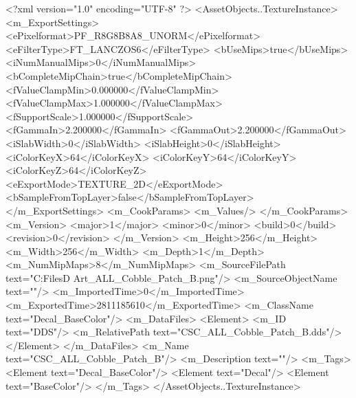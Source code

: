 <?xml version="1.0" encoding="UTF-8" ?>
<AssetObjects..TextureInstance>
	<m_ExportSettings>
		<ePixelformat>PF_R8G8B8A8_UNORM</ePixelformat>
		<eFilterType>FT_LANCZOS6</eFilterType>
		<bUseMips>true</bUseMips>
		<iNumManualMips>0</iNumManualMips>
		<bCompleteMipChain>true</bCompleteMipChain>
		<fValueClampMin>0.000000</fValueClampMin>
		<fValueClampMax>1.000000</fValueClampMax>
		<fSupportScale>1.000000</fSupportScale>
		<fGammaIn>2.200000</fGammaIn>
		<fGammaOut>2.200000</fGammaOut>
		<iSlabWidth>0</iSlabWidth>
		<iSlabHeight>0</iSlabHeight>
		<iColorKeyX>64</iColorKeyX>
		<iColorKeyY>64</iColorKeyY>
		<iColorKeyZ>64</iColorKeyZ>
		<eExportMode>TEXTURE_2D</eExportMode>
		<bSampleFromTopLayer>false</bSampleFromTopLayer>
	</m_ExportSettings>
	<m_CookParams>
		<m_Values/>
	</m_CookParams>
	<m_Version>
		<major>1</major>
		<minor>0</minor>
		<build>0</build>
		<revision>0</revision>
	</m_Version>
	<m_Height>256</m_Height>
	<m_Width>256</m_Width>
	<m_Depth>1</m_Depth>
	<m_NumMipMaps>8</m_NumMipMaps>
	<m_SourceFilePath text="C:\Users\Shadow\Desktop\Working Files\3D Art\Decals\textures\CSC_ALL_Cobble_Patch_B.png"/>
	<m_SourceObjectName text=""/>
	<m_ImportedTime>0</m_ImportedTime>
	<m_ExportedTime>2811185610</m_ExportedTime>
	<m_ClassName text="Decal_BaseColor"/>
	<m_DataFiles>
		<Element>
			<m_ID text="DDS"/>
			<m_RelativePath text="CSC_ALL_Cobble_Patch_B.dds"/>
		</Element>
	</m_DataFiles>
	<m_Name text="CSC_ALL_Cobble_Patch_B"/>
	<m_Description text=""/>
	<m_Tags>
		<Element text="Decal_BaseColor"/>
		<Element text="Decal"/>
		<Element text="BaseColor"/>
	</m_Tags>
</AssetObjects..TextureInstance>

